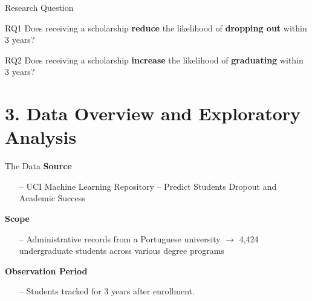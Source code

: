 \documentclass[aspectratio=169]{beamer}
\begin{document}
  
  \begin{frame}{Research Question}
    \begin{alertblock}{RQ1}
	Does receiving a scholarship \textbf{reduce} the likelihood of \textbf{dropping out} within 3 years?
\end{alertblock}
\vspace{10pt}
    \begin{alertblock}{RQ2}
	Does receiving a scholarship \textbf{increase} the likelihood of \textbf{graduating} within 3 years?
\end{alertblock}
  \end{frame}
  

\section{3. Data Overview and Exploratory Analysis}

\begin{frame}{The Data}
	\textbf{Source}
	\begin{itemize}
		\item [--] UCI Machine Learning Repository – Predict Students Dropout and Academic Success 
	\end{itemize}
	
	\textbf{Scope}
	\begin{itemize}
		\item [--] Administrative records from a Portuguese university $\rightarrow$ 4,424 undergraduate students across various degree programs
	\end{itemize}
	
	\textbf{Observation Period}
	\begin{itemize}
		\item [--] Students tracked for 3 years after enrollment.
	\end{itemize}
\end{frame}
\end{document}
